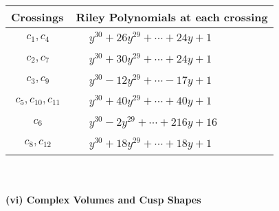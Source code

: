 \documentclass[1p]{elsarticle_modified}
\theoremstyle{definition}
\begin{document}
\begin{tabular}{m{50pt}|m{274pt}}
Crossings & \hspace{64pt}Riley Polynomials at each crossing \\
\hline $$\begin{aligned}c_{1},c_{4}\end{aligned}$$&$\begin{aligned}
&y^{30}+26 y^{29}+\cdots+24 y+1
\end{aligned}$\\
\hline $$\begin{aligned}c_{2},c_{7}\end{aligned}$$&$\begin{aligned}
&y^{30}+30 y^{29}+\cdots+24 y+1
\end{aligned}$\\
\hline $$\begin{aligned}c_{3},c_{9}\end{aligned}$$&$\begin{aligned}
&y^{30}-12 y^{29}+\cdots-17 y+1
\end{aligned}$\\
\hline $$\begin{aligned}c_{5},c_{10},c_{11}\end{aligned}$$&$\begin{aligned}
&y^{30}+40 y^{29}+\cdots+40 y+1
\end{aligned}$\\
\hline $$\begin{aligned}c_{6}\end{aligned}$$&$\begin{aligned}
&y^{30}-2 y^{29}+\cdots+216 y+16
\end{aligned}$\\
\hline $$\begin{aligned}c_{8},c_{12}\end{aligned}$$&$\begin{aligned}
&y^{30}+18 y^{29}+\cdots+18 y+1
\end{aligned}$\\
\hline
\end{tabular}\\~\\
\newpage\flushleft \textbf{(vi) Complex Volumes and Cusp Shapes}
\end{document}
